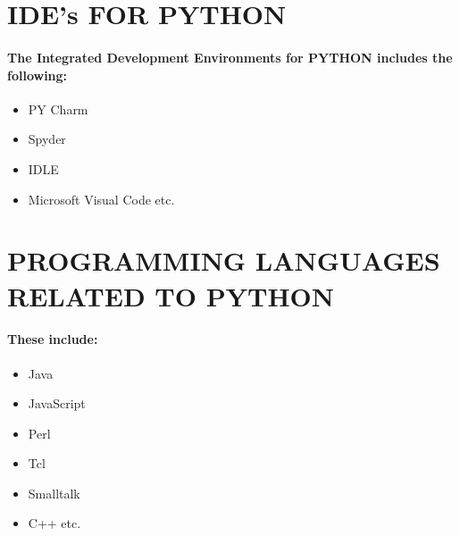\documentclass{article}
\begin{document}
\section*{IDE’s FOR PYTHON}
\paragraph{The Integrated Development Environments for PYTHON includes the following:}
\begin{itemize}
	\item PY Charm
	\item Spyder
	\item IDLE
	\item Microsoft Visual Code etc.
	
	
\end{itemize}
\newpage
\section*{PROGRAMMING LANGUAGES RELATED TO PYTHON}
\paragraph{These include:
}
\begin{itemize}
	\item Java
	\item JavaScript
	\item Perl
	\item Tcl
	\item Smalltalk
	\item C++ etc.
\end{itemize}
\newpage
\pagecolor{white}
\color{black}
\end{document}
